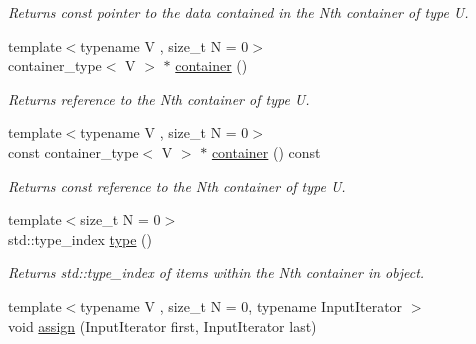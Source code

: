 \begin{DoxyCompactItemize}
\begin{DoxyCompactList}\small\item\em Returns const pointer to the data contained in the Nth container of type U. \end{DoxyCompactList}\item 
\hypertarget{classheterogeneous_1_1heterovector_3_01_t_01_4_a18c8a8a8100b8bdceeb1aa3b744c7227}{}{\footnotesize template$<$typename V , size\+\_\+t N = 0$>$ }\\container\+\_\+type$<$ V $>$ $\ast$ \hyperlink{classheterogeneous_1_1heterovector_3_01_t_01_4_a18c8a8a8100b8bdceeb1aa3b744c7227}{container} ()\label{classheterogeneous_1_1heterovector_3_01_t_01_4_a18c8a8a8100b8bdceeb1aa3b744c7227}

\begin{DoxyCompactList}\small\item\em Returns reference to the Nth container of type U. \end{DoxyCompactList}\item 
\hypertarget{classheterogeneous_1_1heterovector_3_01_t_01_4_af5f9404b0de0059a653b1de33dcc7739}{}{\footnotesize template$<$typename V , size\+\_\+t N = 0$>$ }\\const container\+\_\+type$<$ V $>$ $\ast$ \hyperlink{classheterogeneous_1_1heterovector_3_01_t_01_4_af5f9404b0de0059a653b1de33dcc7739}{container} () const \label{classheterogeneous_1_1heterovector_3_01_t_01_4_af5f9404b0de0059a653b1de33dcc7739}

\begin{DoxyCompactList}\small\item\em Returns const reference to the Nth container of type U. \end{DoxyCompactList}\item 
\hypertarget{classheterogeneous_1_1heterovector_3_01_t_01_4_a806b8c96ee7468888fcee3d226b339e3}{}{\footnotesize template$<$size\+\_\+t N = 0$>$ }\\std\+::type\+\_\+index \hyperlink{classheterogeneous_1_1heterovector_3_01_t_01_4_a806b8c96ee7468888fcee3d226b339e3}{type} ()\label{classheterogeneous_1_1heterovector_3_01_t_01_4_a806b8c96ee7468888fcee3d226b339e3}

\begin{DoxyCompactList}\small\item\em Returns std\+::type\+\_\+index of items within the Nth container in object. \end{DoxyCompactList}\item 
\hypertarget{classheterogeneous_1_1heterovector_3_01_t_01_4_a26d56aa710e7dd4533f01c965727e963}{}{\footnotesize template$<$typename V , size\+\_\+t N = 0, typename Input\+Iterator $>$ }\\void \hyperlink{classheterogeneous_1_1heterovector_3_01_t_01_4_a26d56aa710e7dd4533f01c965727e963}{assign} (Input\+Iterator first, Input\+Iterator last)\label{classheterogeneous_1_1heterovector_3_01_t_01_4_a26d56aa710e7dd4533f01c965727e963}


\end{DoxyCompactItemize}
